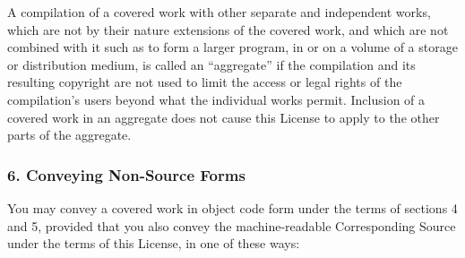 \documentclass[a4paper, 11pt, twoside]{article}
\begin{document}
A compilation of a covered work with other separate and independent works, which are not by their nature extensions of the covered work, and which are not combined with it such as to form a larger program, in or on a volume of a storage or distribution medium, is called an “aggregate” if the compilation and its resulting copyright are not used to limit the access or legal rights of the compilation's users beyond what the individual works permit. Inclusion of a covered work in an aggregate does not cause this License to apply to the other parts of the aggregate.

\subsubsection{6. Conveying Non-Source Forms}

You may convey a covered work in object code form under the terms of sections 4 and 5, provided that you also convey the machine-readable Corresponding Source under the terms of this License, in one of these ways:
\end{document}

